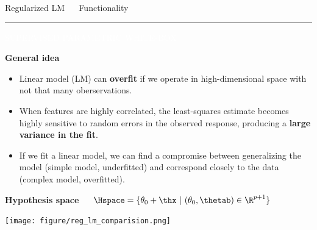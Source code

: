 \documentclass[11pt,compress,t,notes=noshow, xcolor=table]{beamer}
\begin{document}
\LARGE
\begin{frame}{\textcolor{gray!80}{Regularized LM} ~~ Functionality}
\normalsize
\vspace{-0.5cm}
\noindent \textcolor{gray!80}{\rule{\textwidth}{1pt}}

\vspace{0.3cm}

\footnotesize

\colorbox{gray!80}{\textcolor{white}{SUPERVISED}}
\colorbox{gray!80}{\textcolor{white}{PARAMETRIC}}
\colorbox{gray!80}{\textcolor{white}{WHITE-BOX}}

\medskip

\textbf{\textcolor{gray!80}{General idea}} ~~
\begin{itemize}

\item Linear model (LM) can \textbf{overfit} if we operate in high-dimensional space with not that many oberservations.

\item When features are highly correlated, the least-squares estimate becomes highly sensitive to random errors in the observed response, producing a \textbf{large variance in the fit}.

\item If we fit a linear model, we can find a compromise between generalizing the model (simple model, underfitted) and correspond closely to the data (complex model, overfitted).

\end{itemize}

\medskip

\textbf{\textcolor{gray!80}{Hypothesis space}} ~~
$\Hspace = \{ \theta_0 + \thx\ |\ (\theta_0, \thetab) \in \R^{p+1} \} $

\medskip
\centering
  \texttt{[image: figure/reg\_lm\_comparision.png]}

\end{frame}

\end{document}
